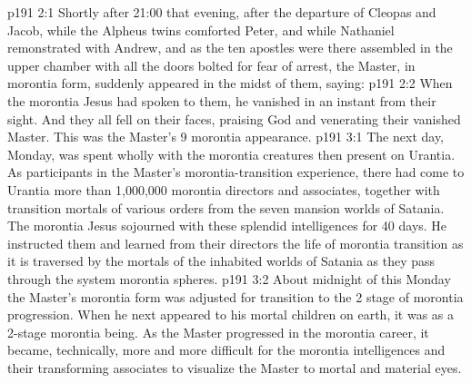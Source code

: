 \vs p191 2:1 Shortly after 21:00 that evening, after the departure of Cleopas and Jacob, while the Alpheus twins comforted Peter, and while Nathaniel remonstrated with Andrew, and as the ten apostles were there assembled in the upper chamber with all the doors bolted for fear of arrest, the Master, in morontia form, suddenly appeared in the midst of them, saying: 
\vs p191 2:2 When the morontia Jesus had spoken to them, he vanished in an instant from their sight. And they all fell on their faces, praising God and venerating their vanished Master. This was the Master’s 9 morontia appearance.
\vs p191 3:1 The next day, Monday, was spent wholly with the morontia creatures then present on Urantia. As participants in the Master’s morontia\hyp{}transition experience, there had come to Urantia more than 1,000,000 morontia directors and associates, together with transition mortals of various orders from the seven mansion worlds of Satania. The morontia Jesus sojourned with these splendid intelligences for 40 days. He instructed them and learned from their directors the life of morontia transition as it is traversed by the mortals of the inhabited worlds of Satania as they pass through the system morontia spheres.
\vs p191 3:2 About midnight of this Monday the Master’s morontia form was adjusted for transition to the 2 stage of morontia progression. When he next appeared to his mortal children on earth, it was as a 2\hyp{}stage morontia being. As the Master progressed in the morontia career, it became, technically, more and more difficult for the morontia intelligences and their transforming associates to visualize the Master to mortal and material eyes.
